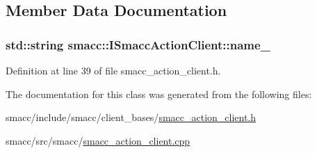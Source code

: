 \subsection{Member Data Documentation}
\subsubsection[{\texorpdfstring{name\+\_\+}{name_}}]{\setlength{\rightskip}{0pt plus 5cm}std\+::string smacc\+::\+I\+Smacc\+Action\+Client\+::name\+\_\+\hspace{0.3cm}{\ttfamily [protected]}}\hypertarget{classsmacc_1_1ISmaccActionClient_aec84a0169bf40d394207540ad75b364e}{}\label{classsmacc_1_1ISmaccActionClient_aec84a0169bf40d394207540ad75b364e}


Definition at line 39 of file smacc\+\_\+action\+\_\+client.\+h.



The documentation for this class was generated from the following files\+:\begin{DoxyCompactItemize}
\item 
smacc/include/smacc/client\+\_\+bases/\hyperlink{smacc__action__client_8h}{smacc\+\_\+action\+\_\+client.\+h}\item 
smacc/src/smacc/\hyperlink{src_2smacc_2smacc__action__client_8cpp}{smacc\+\_\+action\+\_\+client.\+cpp}\end{DoxyCompactItemize}
